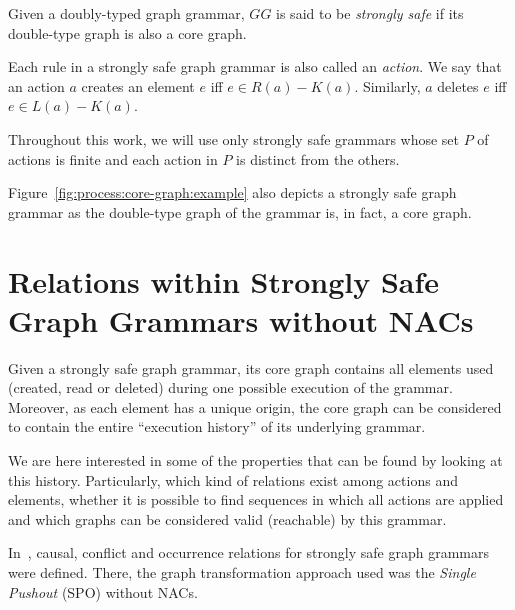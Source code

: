 \begin{definition} Given \doublyTypedGraphGrammarCore{} a doubly-typed graph grammar, $GG$ is said to be \emph{strongly safe} if its double-type graph is also a core graph.

  Each rule in a strongly safe graph grammar is also called an \emph{action}. We say that an action $a$ creates an element $e$ iff $e \in R(a) - K(a)$. Similarly, $a$ deletes $e$ iff \mbox{$e \in L(a) - K(a)$}.


\end{definition}

\begin{remark} Throughout this work, we will use only strongly safe grammars whose set $P$ of actions is finite and each action in $P$ is distinct from the others.

\end{remark}

\begin{example} Figure~\ref{fig:process:core-graph:example} also depicts a strongly safe graph grammar as the double-type graph of the grammar is, in fact, a core graph.
\end{example}

\section{Relations within Strongly Safe Graph Grammars without NACs}

Given a strongly safe graph grammar, its core graph contains all elements used (created, read or deleted) during one possible execution of the grammar. Moreover, as each element has a unique origin, the core graph can be considered to contain the entire ``execution history'' of its underlying grammar.

We are here interested in some of the properties that can be found by looking at this history. Particularly, which kind of relations exist among actions and elements, whether it is possible to find sequences in which all actions are applied and which graphs can be considered valid (reachable) by this grammar.

In~\cite{Ribeiro1996}, causal, conflict and occurrence relations for strongly safe graph grammars were defined. There, the graph transformation approach used was the \emph{Single Pushout} (SPO) without NACs.

